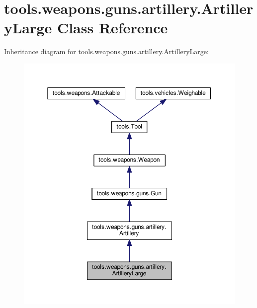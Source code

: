 \hypertarget{classtools_1_1weapons_1_1guns_1_1artillery_1_1_artillery_large}{}\section{tools.\+weapons.\+guns.\+artillery.\+Artillery\+Large Class Reference}
\label{classtools_1_1weapons_1_1guns_1_1artillery_1_1_artillery_large}


Inheritance diagram for tools.\+weapons.\+guns.\+artillery.\+Artillery\+Large\+:
\nopagebreak
\begin{figure}[H]
\begin{center}
\leavevmode
\includegraphics[width=350pt]{classtools_1_1weapons_1_1guns_1_1artillery_1_1_artillery_large__inherit__graph}
\end{center}
\end{figure}


